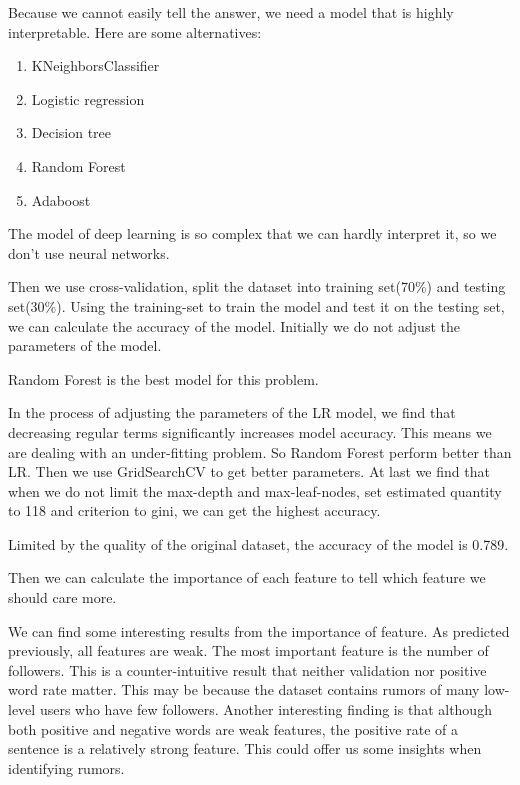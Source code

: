 \documentclass[12pt,a4paper]{article}
\begin{document}
Because we cannot easily tell the answer, we need a model that is highly interpretable.  Here are some alternatives:
\begin{enumerate}
	\item KNeighborsClassifier 
	\item 	Logistic regression
	\item 	Decision tree
	\item 	Random Forest
	\item 	Adaboost
\end{enumerate}

The model of deep learning is so complex that we can hardly interpret it, so we don't use neural networks.

Then we use cross-validation, split the dataset into training set(70\%) and testing set(30\%). Using the training-set to train the model and test it on the testing set, we can calculate the accuracy of the model. 
Initially we do not adjust the parameters of the model. 






Random Forest is the best model for this problem.

In the process of adjusting the parameters of the LR model, we find that decreasing regular terms significantly increases model accuracy. This means we are dealing with an under-fitting problem. So Random Forest perform better than LR. Then we use GridSearchCV to get better parameters. At last we find that when we do not limit the max-depth and max-leaf-nodes, set estimated quantity to 118 and criterion to gini, we can get the highest accuracy. 

Limited by the quality of the original dataset, the accuracy of the model is 0.789.

Then we can calculate the importance of each feature to tell which feature we should care more.

We can find some interesting results from the importance of feature. As predicted previously, all features are weak. The most important feature is the number of followers. This is a counter-intuitive result that neither validation nor positive word rate matter. This may be because the dataset contains rumors of many low-level users who have few followers. Another interesting finding is that although both positive and negative words are weak features, the positive rate of a sentence is a relatively strong feature. This could offer us some insights when identifying rumors.
\end{document}
